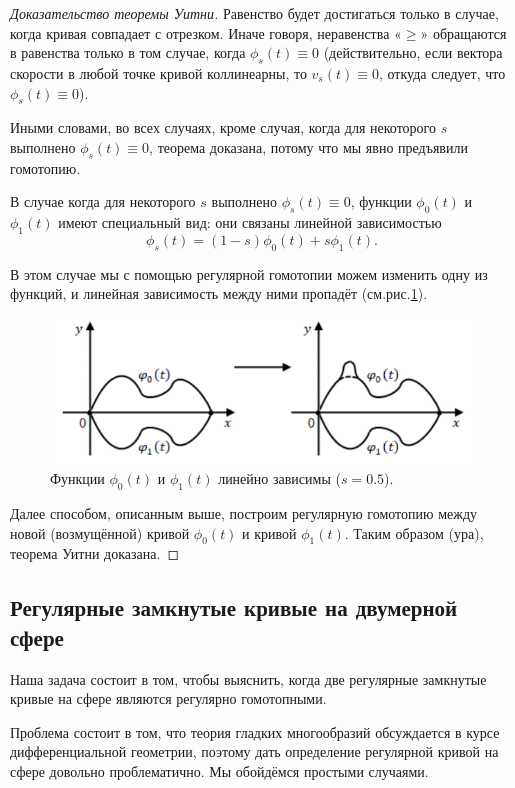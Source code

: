 \begin{proof}[Доказательство теоремы Уитни]
    Равенство будет достигаться только в случае, когда кривая совпадает с отрезком. Иначе говоря, неравенства «$\geqslant$» обращаются в равенства только в том случае, когда $\phi_s(t) \equiv 0$ (действительно, если вектора скорости в любой точке кривой коллинеарны, то $v_s(t) \equiv 0$, откуда следует, что $\phi_s(t) \equiv 0$).

    Иными словами, во всех случаях, кроме случая, когда для некоторого $s$ выполнено $\phi_s(t) \equiv 0$, теорема доказана, потому что мы явно предъявили гомотопию.

    В случае когда для некоторого $s$ выполнено $\phi_s(t) \equiv 0$, функции $\phi_0(t)$ и $\phi_1(t)$ имеют специальный вид: они связаны линейной зависимостью 
    \[\phi_s(t) = (1-s)\phi_0(t) + s\phi_1(t).\]

    В этом случае мы с помощью регулярной гомотопии можем изменить одну из функций, и линейная зависимость между ними пропадёт (см.рис.\ref{fig:c13.4}).

    \begin{figure}[htbp]
        \centering
        \includegraphics[scale=0.7]{images/c13.4.png}
        \caption{Функции $\phi_0(t)$ и $\phi_1(t)$ линейно зависимы ($s = 0.5$).}
        \label{fig:c13.4}
    \end{figure}


    Далее способом, описанным выше, построим регулярную гомотопию между новой (возмущённой) кривой $\phi_0(t)$ и кривой $\phi_1(t)$. Таким образом (ура), теорема Уитни доказана.
\end{proof} 

\subsection{Регулярные замкнутые кривые на двумерной сфере}
Наша задача состоит в том, чтобы выяснить, когда две регулярные замкнутые кривые на сфере являются регулярно гомотопными.

Проблема состоит в том, что теория гладких многообразий обсуждается в курсе дифференциальной геометрии, поэтому дать определение регулярной кривой на сфере довольно проблематично. Мы обойдёмся простыми случаями.

